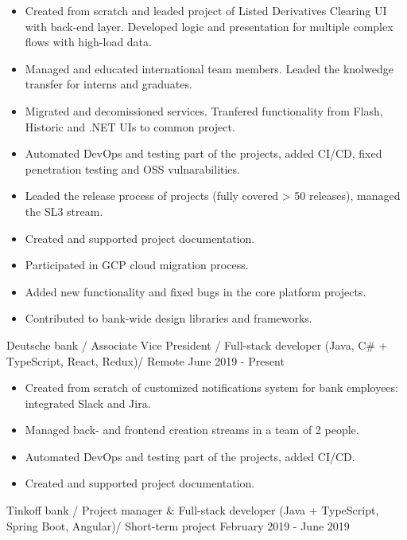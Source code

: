 

\vspace{0cm}\begin{cventries}
\cventry
{
\vspace{-0.4cm}
\begin{itemize}
\item Created from scratch and leaded project of Listed Derivatives Clearing UI with back-end layer. Developed logic and presentation for multiple complex flows with high-load data.
\item Managed and educated international team members. Leaded the knolwedge transfer for interns and graduates.
\item Migrated and decomissioned services. Tranfered functionality from Flash, Historic and .NET UIs to common project. 
\item Automated DevOps and testing part of the projects, added CI/CD, fixed penetration testing and OSS vulnarabilities. 
\item Leaded the release process of projects (fully covered > 50 releases), managed the SL3 stream.
\item Created and supported project documentation.
\item Participated in GCP cloud migration process.
\item Added new functionality and fixed bugs in the core platform projects.
\item Contributed to bank-wide design libraries and frameworks.
\end{itemize}
} %
{Deutsche bank / Associate Vice President / Full-stack developer (Java, C\# + TypeScript, React, Redux)/ Remote} %
{} %
{June 2019 - Present} %
\noindent	

\vspace{-0.4cm}
\cventry
{
\vspace{-0.4cm}
\begin{itemize}
\item Created from scratch of customized notifications system for bank employees: integrated Slack and Jira.
\item Managed back- and frontend creation streams in a team of 2 people.
\item Automated DevOps and testing part of the projects, added CI/CD. 
\item Created and supported project documentation.
\end{itemize}
} %
{Tinkoff bank / Project manager \& Full-stack developer (Java + TypeScript, Spring Boot, Angular)/ Short-term project} %
{} %
{February 2019 - June 2019} %
\noindent	


\end{cventries}
